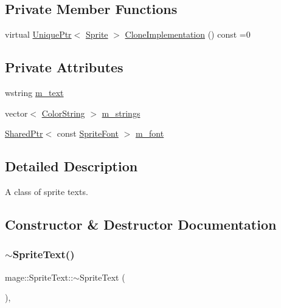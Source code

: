 \subsection*{Private Member Functions}
\begin{DoxyCompactItemize}
\item 
virtual \hyperlink{namespacemage_a3316d7143a973e37adf1110f2e80ca31}{Unique\+Ptr}$<$ \hyperlink{classmage_1_1_sprite}{Sprite} $>$ \hyperlink{classmage_1_1_sprite_text_aa2c63346f5ad7f63f7a6d474df3556ef}{Clone\+Implementation} () const =0
\end{DoxyCompactItemize}
\subsection*{Private Attributes}
\begin{DoxyCompactItemize}
\item 
wstring \hyperlink{classmage_1_1_sprite_text_a807d5dc467ef16f6c83762dfe6ad3391}{m\+\_\+text}
\item 
vector$<$ \hyperlink{classmage_1_1_color_string}{Color\+String} $>$ \hyperlink{classmage_1_1_sprite_text_ab528f96257fd7e690be765241b2d76f7}{m\+\_\+strings}
\item 
\hyperlink{namespacemage_a1e01ae66713838a7a67d30e44c67703e}{Shared\+Ptr}$<$ const \hyperlink{classmage_1_1_sprite_font}{Sprite\+Font} $>$ \hyperlink{classmage_1_1_sprite_text_a7d5f122cd5a87e47786796e41dbf6b71}{m\+\_\+font}
\end{DoxyCompactItemize}


\subsection{Detailed Description}
A class of sprite texts. 

\subsection{Constructor \& Destructor Documentation}
\hypertarget{classmage_1_1_sprite_text_aa30d68a79775dce902c190f2cd298bb4}{}\label{classmage_1_1_sprite_text_aa30d68a79775dce902c190f2cd298bb4} 
\subsubsection{\texorpdfstring{$\sim$\+Sprite\+Text()}{~SpriteText()}}
{\footnotesize\ttfamily mage\+::\+Sprite\+Text\+::$\sim$\+Sprite\+Text (\begin{DoxyParamCaption}{ }\end{DoxyParamCaption})\hspace{0.3cm}{\ttfamily [virtual]}, {\ttfamily [default]}}

